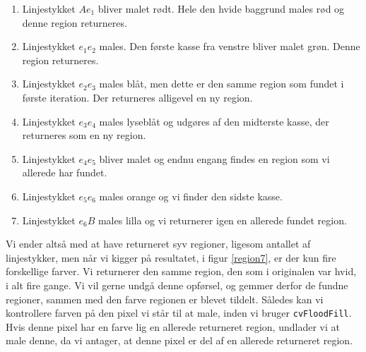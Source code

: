 {\begin{enumerate}
    \item Linjestykket $Ae_1$ bliver malet rødt. Hele den hvide baggrund
        males rød og denne region returneres.
    \item Linjestykket $e_1e_2$ males. Den første kasse fra venstre
        bliver malet grøn. Denne region returneres.
    \item Linjestykket $e_2e_3$ males blåt, men dette er den samme region som
        fundet i første iteration. Der returneres alligevel en ny
        region.
    \item Linjestykket $e_3e_4$ males lyseblåt og udgøres af den
        midterste kasse, der returneres som en ny region.
    \item Linjestykket $e_4e_5$ bliver malet og endnu engang findes en
        region som vi allerede har fundet.
    \item Linjestykket $e_5e_6$ males orange og vi finder den sidste
        kasse.
    \item Linjestykket $e_6B$ males lilla og vi returnerer igen en
        allerede fundet region.
\end{enumerate}
\clearpage
Vi ender altså med at have returneret syv regioner, ligesom antallet af
linjestykker, men når vi kigger på resultatet, i figur \ref{region7}, er
der kun fire forskellige farver. Vi returnerer den samme region, den som
i originalen var hvid, i alt fire gange. Vi vil gerne undgå denne
opførsel, og gemmer derfor de fundne regioner, sammen med den farve
regionen er blevet tildelt. Således kan vi kontrollere farven på den
pixel vi står til at male, inden vi bruger \texttt{cvFloodFill}. Hvis
denne pixel har en farve lig en allerede returneret region, undlader vi
at male denne, da vi antager, at denne pixel er del af en allerede
returneret region.

}
